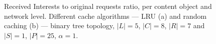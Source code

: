 \begin{figure}[h!]
    \centering


    \cprotect\caption{Received Interests to original requests ratio, per content 
        object and network level. Different cache algorithms --- LRU (a) and 
        random caching (b) --- binary tree topology, $|L| = 5$, $|C| = 8$, 
        $|R| = 7$ and $|S| = 1$, $|P| = 25$, $\alpha = 1$.}
    \label{fig:exp-results-latency-tree}

\end{figure}

